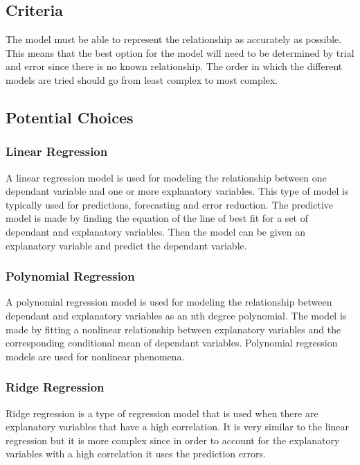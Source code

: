 \documentclass[onecolumn, draftclsnofoot,10pt, compsoc]{IEEEtran}
\begin{document}
		\subsection{Criteria}

        The model must be able to represent the relationship as accurately as possible. This means that the best option for the model will need to be determined by trial and error since there is no known relationship. The order in which the different models are tried should go from least complex to most complex.

		\subsection{Potential Choices}

		\subsubsection{Linear Regression}
		
		A linear regression model is used for modeling the relationship between one dependant variable and one or more explanatory variables. This type of model is typically used for predictions, forecasting and error reduction. The predictive model is made by finding the equation of the line of best fit for a set of dependant and explanatory variables. Then the model can be given an explanatory variable and predict the dependant variable.\cite{Linear}

		\subsubsection{Polynomial Regression}
		
		A polynomial regression model is used for modeling the relationship between dependant and explanatory variables as an nth degree polynomial. The model is made by fitting a nonlinear relationship between explanatory variables and the corresponding conditional mean of dependant variables. Polynomial regression models are used for nonlinear phenomena.\cite{Poly}

		\subsubsection{Ridge Regression}
		
		Ridge regression is a type of regression model that is used when there are explanatory variables that have a high correlation. It is very similar to the linear regression but it is more complex since in order to account for the explanatory variables with a high correlation it uses the prediction errors.\cite{Ridge} 
		
\end{document}
